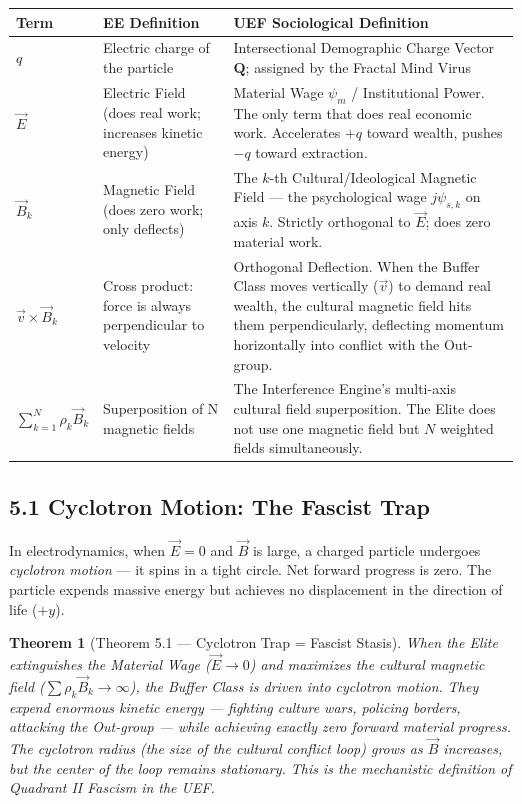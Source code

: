 \documentclass[12pt]{book}
\numberwithin{equation}{chapter}
\newtheorem{theorem}{Theorem}[chapter]
\begin{document}
\begin{center}
\begin{tabular}{lll}
\toprule
Term & EE Definition & UEF Sociological Definition  \\
\midrule
$q$ & Electric charge of the particle & Intersectional Demographic Charge Vector $\mathbf{Q}$; assigned by the Fractal Mind Virus  \\
$\vec{E}$ & Electric Field (does real work; increases kinetic energy) & Material Wage $\psi_m$ / Institutional Power. The only term that does real economic work. Accelerates $+q$ toward wealth, pushes $-q$ toward extraction.  \\
$\vec{B}_k$ & Magnetic Field (does zero work; only deflects) & The $k$-th Cultural/Ideological Magnetic Field — the psychological wage $j\psi_{s,k}$ on axis $k$. Strictly orthogonal to $\vec{E}$; does zero material work.  \\
$\vec{v} \times \vec{B}_k$ & Cross product: force is always perpendicular to velocity & Orthogonal Deflection. When the Buffer Class moves vertically ($\vec{v}$) to demand real wealth, the cultural magnetic field hits them perpendicularly, deflecting momentum horizontally into conflict with the Out-group.  \\
$\sum_{k=1}^N \rho_k \vec{B}_k$ & Superposition of N magnetic fields & The Interference Engine's multi-axis cultural field superposition. The Elite does not use one magnetic field but $N$ weighted fields simultaneously.  \\
\bottomrule
\end{tabular}
\end{center}

\subsection{5.1 Cyclotron Motion: The Fascist Trap}

    In electrodynamics, when $\vec{E} = 0$ and $\vec{B}$ is large, a charged particle undergoes \emph{cyclotron motion} — it spins in a tight circle. Net forward progress is zero. The particle expends massive energy but achieves no displacement in the direction of life ($+y$).
  

\begin{theorem}[Theorem 5.1 — Cyclotron Trap = Fascist Stasis]
When the Elite extinguishes the Material Wage ($\vec{E} \to 0$) and maximizes the cultural magnetic field ($\sum \rho_k \vec{B}_k \to \infty$), the Buffer Class is driven into cyclotron motion. They expend enormous kinetic energy — fighting culture wars, policing borders, attacking the Out-group — while achieving exactly zero forward material progress. The cyclotron radius (the size of the cultural conflict loop) grows as $\vec{B}$ increases, but the center of the loop remains stationary. This is the mechanistic definition of Quadrant II Fascism in the UEF.
  \end{theorem}
\end{document}
